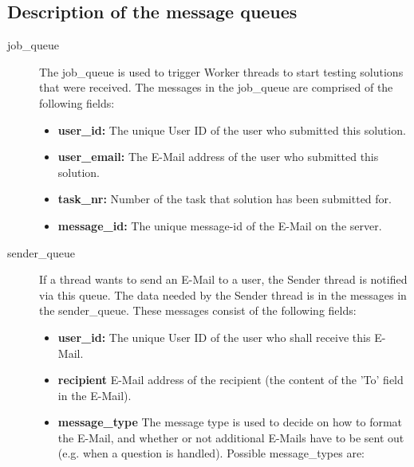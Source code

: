 \subsection{Description of the message queues} \label{app:queues}

\begin{description}
\item [job\_queue] The job\_queue is used to trigger Worker threads to start testing 
	solutions that were received. The messages in the job\_queue are comprised of 
	the following fields:
    \begin{itemize}
        \item {\bf user\_id:} The unique User ID of the user who submitted this solution.
        \item {\bf user\_email:} The E-Mail address of the user who submitted this solution.
        \item {\bf task\_nr:} Number of the task that solution has been submitted for.
        \item {\bf message\_id:} The unique message-id of the E-Mail on the server.
    \end{itemize}

\item [sender\_queue] If a thread wants to send an E-Mail to a user, the Sender thread 
	is notified via this queue. The data needed by the Sender thread is in the messages 
	in the sender\_queue. These messages consist of the following fields:
    \begin{itemize}
        \item {\bf user\_id:} The unique User ID of the user who shall receive this E-Mail.
        \item {\bf recipient} E-Mail address of the recipient (the content of the 
			'To' field in the E-Mail).
        \item {\bf message\_type} The message type is used to decide on how to format 
			the E-Mail, and whether or not additional E-Mails have to be sent out 
			(e.g. when a question is handled). Possible message\_types are:


\end{itemize}
\end{description}
